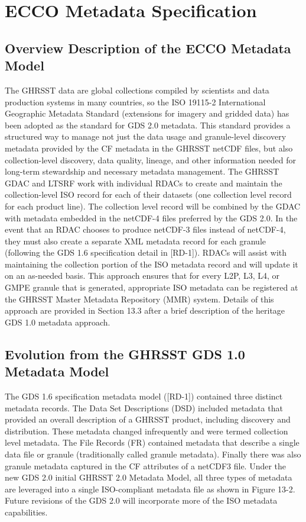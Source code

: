 \pagebreak
\section{ECCO Metadata Specification}
\subsection{Overview Description of the ECCO Metadata Model}
The GHRSST data are global collections compiled by scientists and data production systems in many
countries, so the ISO 19115-2 International Geographic Metadata Standard (extensions for imagery
and gridded data) has been adopted as the standard for GDS 2.0 metadata. This standard provides a
structured way to manage not just the data usage and granule-level discovery metadata provided by
the CF metadata in the GHRSST netCDF files, but also collection-level discovery, data quality,
lineage, and other information needed for long-term stewardship and necessary metadata
management. The GHRSST GDAC and LTSRF work with individual RDACs to create and maintain
the collection-level ISO record for each of their datasets (one collection level record for each product
line). The collection level record will be combined by the GDAC with metadata embedded in the
netCDF-4 files preferred by the GDS 2.0. In the event that an RDAC chooses to produce netCDF-3
files instead of netCDF-4, they must also create a separate XML metadata record for each granule
(following the GDS 1.6 specification detail in [RD-1]). RDACs will assist with maintaining the collection
portion of the ISO metadata record and will update it on an as-needed basis. This approach ensures
that for every L2P, L3, L4, or GMPE granule that is generated, appropriate ISO metadata can be
registered at the GHRSST Master Metadata Repository (MMR) system. Details of this approach are
provided in Section 13.3 after a brief description of the heritage GDS 1.0 metadata approach.
\par

\subsection{Evolution from the GHRSST GDS 1.0 Metadata Model}
The GDS 1.6 specification metadata model ([RD-1]) contained three distinct metadata records. The
Data Set Descriptions (DSD) included metadata that provided an overall description of a GHRSST
product, including discovery and distribution. These metadata changed infrequently and were termed
collection level metadata. The File Records (FR) contained metadata that describe a single data file
or granule (traditionally called granule metadata). Finally there was also granule metadata captured in
the CF attributes of a netCDF3 file. Under the new GDS 2.0 initial GHRSST 2.0 Metadata Model, all
three types of metadata are leveraged into a single ISO-compliant metadata file as shown in Figure
13-2. Future revisions of the GDS 2.0 will incorporate more of the ISO metadata capabilities.
\par

